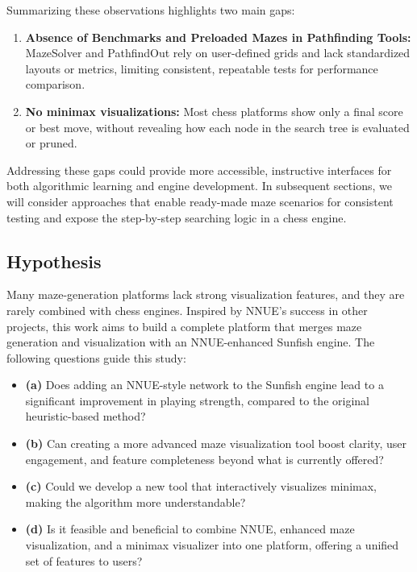 \documentclass[12pt,a4paper]{article}
\begin{document}
Summarizing these observations highlights two main gaps:
\begin{enumerate}
    \item \textbf{Absence of Benchmarks and Preloaded Mazes in Pathfinding Tools:}
    MazeSolver \cite{mazeSolverSite} and PathfindOut \cite{pathfindoutSite} rely on user-defined grids and lack standardized layouts or metrics, limiting consistent, repeatable tests for performance comparison.
    \item \textbf{No minimax visualizations:}
    Most chess platforms show only a final score or best move, without revealing how each node in the search tree is evaluated or pruned.
\end{enumerate}

Addressing these gaps could provide more accessible, instructive interfaces for both algorithmic learning and engine development. In subsequent sections, we will consider approaches that enable ready-made maze scenarios for consistent testing and expose the step-by-step searching logic in a chess engine.

\subsection{Hypothesis}
\label{sec:hypothesis}

Many maze-generation platforms lack strong visualization features, and they are
rarely combined with chess engines. Inspired by NNUE’s success in other projects,
this work aims to build a complete platform that merges maze generation and
visualization with an NNUE-enhanced Sunfish engine. The following questions guide
this study:

\begin{itemize}[label={}, leftmargin=1em]

\item \textbf{(a)} Does adding an NNUE-style network to the Sunfish engine lead
to a significant improvement in playing strength, compared to the original
heuristic-based method?

\item \textbf{(b)} Can creating a more advanced maze visualization tool boost
clarity, user engagement, and feature completeness beyond what is currently
offered?

\item \textbf{(c)} Could we develop a new tool that interactively visualizes minimax, making the algorithm more understandable?

\item \textbf{(d)} Is it feasible and beneficial to combine NNUE, enhanced maze
visualization, and a minimax visualizer into one platform, offering a unified set
of features to users?

\end{itemize}
\end{document}
